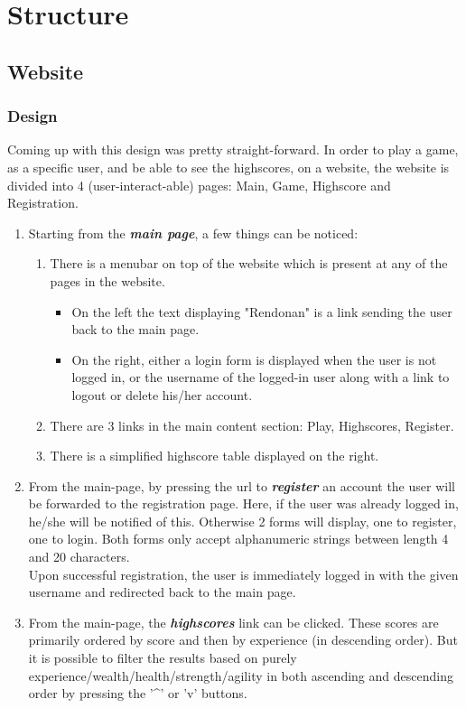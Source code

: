 \documentclass[12pt]{report}
\begin{document}
\section*{Structure}
\subsection*{Website}
\subsubsection{Design}
Coming up with this design was pretty straight-forward. In order to play a game, as a specific user, and be able to see the highscores, on a website, the website is divided into 4 (user-interact-able) pages: Main, Game, Highscore and Registration.
\begin{enumerate}
\item Starting from the \emph{\textbf{main page}}, a few things can be noticed:
\begin{enumerate}
\item There is a menubar on top of the website which is present at any of the pages in the website.
\begin{itemize}
\item On the left the text displaying "Rendonan" is a link sending the user back to the main page.
\item On the right, either a login form is displayed when the user is not logged in, or the username of the logged-in user along with a link to logout or delete his/her account.
\end{itemize}
\item There are 3 links in the main content section: Play, Highscores, Register.
\item There is a simplified highscore table displayed on the right.
\end{enumerate}
\item From the main-page, by pressing the url to \emph{\textbf{register}} an account the user will be forwarded to the registration page. Here, if the user was already logged in, he/she will be notified of this. Otherwise 2 forms will display, one to register, one to login. Both forms only accept alphanumeric strings between length 4 and 20 characters.\\
Upon successful registration, the user is immediately logged in with the given username and redirected back to the main page.
\item From the main-page, the \emph{\textbf{highscores}} link can be clicked. These scores are primarily ordered by score and then by experience (in descending order). But it is possible to filter the results based on purely experience/wealth/health/strength/agility in both ascending and descending order by pressing the '\textasciicircum' or 'v' buttons.\\

\end{enumerate}
\end{document}
